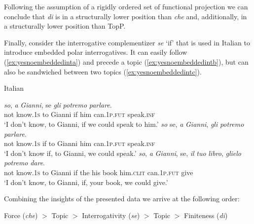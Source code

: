 \noindent Following the assumption of a rigidly ordered set of functional projection we can conclude that \textit{di} is in a structurally lower position than \textit{che} and, additionally, in a structurally lower position than TopP.

Finally, consider the interrogative complementizer \textit{se} `if' that is used in Italian to introduce embedded polar interrogatives. It can easily follow (\ref{ex:yesnoembeddedinta}) and precede a topic (\ref{ex:yesnoembeddedintb}), but can also be sandwiched between two topics (\ref{ex:yesnoembeddedintc}).

\begin{exe}
\ex Italian \citep[205]{rizzi2013notes} \label{yesnoembeddedint}\begin{xlist} 
\ex {} {\textit{so},} {\textit{a}} {\textit{Gianni},} {se} {\textit{gli}} {\textit{potremo}} {\textit{parlare}.}  \\
{not} {know.\textsc{1s}} {to} {Gianni} {if} {him} {can.\textsc{1p.fut}} {speak.\textsc{inf}} \\
\trans `I don't know, to Gianni, if we could speak to him.' \label{ex:yesnoembeddedinta}
\ex {} {\textit{so}} {se,} {\textit{a}} {\textit{Gianni},} {\textit{gli}} {\textit{potremo}} {\textit{parlare}.}  \\
{not} {know.\textsc{1s}} {if} {to} {Gianni} {him} {can.\textsc{1p.fut}} {speak.\textsc{inf}} \\
\trans `I don’t know if, to Gianni, we could speak.' \label{ex:yesnoembeddedintb}
\ex {} {\textit{so},} {\textit{a}} {\textit{Gianni},} {se,} {\textit{il}} {\textit{tuo}} {\textit{libro},} {\textit{glielo}} {\textit{potremo}} {\textit{dare}.}  \\
{not} {know.\textsc{1s}} {to} {Gianni} {if} {the} {his} {book} {him.\textsc{clit}} {can.\textsc{1p.fut}} {give} \\
\trans `I don’t know, to Gianni, if, your book, we could give.' \label{ex:yesnoembeddedintc}
\end{xlist}
\end{exe}


\noindent Combining the insights of the presented data we arrive at the following order:

\begin{exe}
\ex Force (\textit{che}) $>$ Topic $>$ Interrogativity (\textit{se}) $>$ Topic $>$ Finiteness (\textit{di})
\end{exe}

